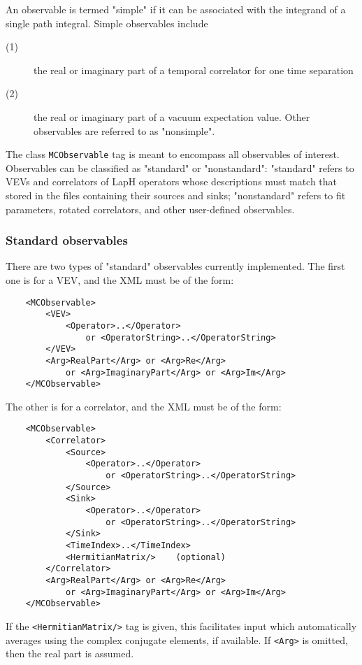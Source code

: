 \documentclass[12pt,notitlepage,letterpaper]{article}
\newcommand{\vb}{\texttt}
\begin{document}
An observable is termed "simple" if it can be associated with
the integrand of a single path integral.  Simple observables include
\begin{description}
\item[(1)] the real or imaginary part of a temporal correlator
for one time separation
\item[(2)] the real or imaginary part of a vacuum expectation value.
Other observables are referred to as "nonsimple".
\end{description}

The class \vb{MCObservable} tag is meant to encompass all observables
of interest.  Observables can be classified as "standard"
or "nonstandard":  "standard" refers to VEVs and correlators
of LapH operators whose descriptions must match that stored
in the files containing their sources and sinks; "nonstandard"
refers to fit parameters, rotated correlators, and other
user-defined observables.

\subsubsection{Standard observables}

There are two types of "standard" observables currently
implemented. The first one is for a VEV, and the XML
must be of the form:
\begin{verbatim}
    <MCObservable>
        <VEV>
            <Operator>..</Operator>
                or <OperatorString>..</OperatorString>
        </VEV>
        <Arg>RealPart</Arg> or <Arg>Re</Arg>
            or <Arg>ImaginaryPart</Arg> or <Arg>Im</Arg>
    </MCObservable>
\end{verbatim}
The other is for a correlator, and the XML must be of the form:
\begin{verbatim}
    <MCObservable>
        <Correlator>
            <Source>
                <Operator>..</Operator>
                    or <OperatorString>..</OperatorString>
            </Source>
            <Sink>
                <Operator>..</Operator>
                    or <OperatorString>..</OperatorString>
            </Sink>
            <TimeIndex>..</TimeIndex>
            <HermitianMatrix/>    (optional)
        </Correlator>
        <Arg>RealPart</Arg> or <Arg>Re</Arg>
            or <Arg>ImaginaryPart</Arg> or <Arg>Im</Arg>
    </MCObservable>
\end{verbatim}
If the \vb{<HermitianMatrix/>} tag is given, this facilitates
input which automatically averages using the complex
conjugate elements, if available.  If \vb{<Arg>} is omitted, then
the real part is assumed.
\end{document}
